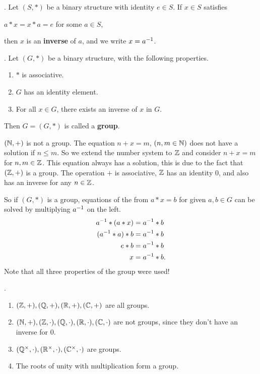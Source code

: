 
.  Let \((S, *)\) be a binary structure with identity \(e \in S\). If \(x \in S\) satisfies
\begin{center}
    \(a * x = x * a = e\) for some \(a \in S\),
\end{center}
then \(x\) is an \textbf{inverse} of \(a\), and we write \(x = a^{-1}\).

.  Let \((G, *)\) be a binary structure, with the following properties.
\begin{enumerate}
    \item \(*\) is associative.
    \item \(G\) has an identity element.
    \item For all \(x \in G\), there exists an inverse of \(x\) in \(G\).
\end{enumerate}
Then \(G = (G, *)\) is called a \textbf{group}.

\((\mathbb{N}, +)\) is not a group. The equation \(n + x = m\), \((n, m \in \mathbb{N})\) does not have a solution if \(n \leq m\). So we extend the number system to \(\mathbb{Z}\) and consider \(n + x = m\) for \(n, m \in \mathbb{Z}\). This equation always has a solution, this is due to the fact that \((\mathbb{Z}, +)\) is a group. The operation \(+\) is associative, \(\mathbb{Z}\) has an identity \(0\), and also has an inverse for any \(n \in \mathbb{Z}\).

So if \((G, *)\) is a group, equations of the from \(a * x = b\) for given \(a, b \in G\) can be solved by multiplying \(a^{-1}\) on the left.
\[
    \begin{aligned}
        a^{-1} * (a * x) & = a^{-1} * b    \\
        (a^{-1} * a) * b & = a^{-1} * b  \\
        e * b           & = a^{-1} * b  \\
        x               & = a^{-1} * b.
    \end{aligned}
\]
Note that all three properties of the group were used!

\ex.
\begin{enumerate}
    \item \((\mathbb{Z}, +), (\mathbb{Q}, +), (\mathbb{R}, +), (\mathbb{C}, +)\) are all groups.
    \item \((\mathbb{N}, +), (\mathbb{Z}, \cdot), (\mathbb{Q}, \cdot), (\mathbb{R}, \cdot), (\mathbb{C}, \cdot)\) are not groups, since they don't have an inverse for \(0\).
    \item \((\mathbb{Q}^\times, \cdot), (\mathbb{R}^\times, \cdot), (\mathbb{C}^\times, \cdot)\) are groups.
    \item The roots of unity with multiplication form a group.
\end{enumerate}

